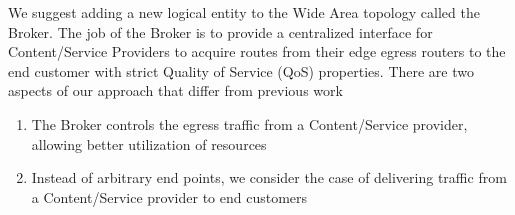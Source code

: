 We suggest adding a new logical entity to the Wide Area topology called the Broker. The job of the Broker is to provide a centralized interface for Content/Service Providers to acquire routes from their edge egress routers to the end customer with strict Quality of Service (QoS)  properties. There are two aspects of our approach that differ from previous work

\begin{enumerate}
\item The Broker controls the egress traffic from a Content/Service provider, allowing better utilization of resources
\item Instead of arbitrary end points, we consider the case of delivering traffic from a Content/Service provider to end customers
\end{enumerate}

